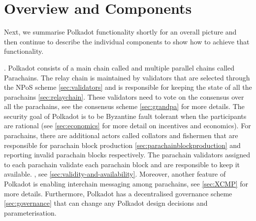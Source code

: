 \section{Overview and Components}\label{sec:components}
Next, we summarise Polkadot functionality shortly for an overall picture and then continue to describe the individual components to show how to achieve that functionality.

. Polkadot consists of a main chain called  and multiple parallel chains
called Parachains. The relay chain is maintained by validators that are selected through the NPoS scheme \ref{sec:validators} and is responsible for  keeping the state of all the parachains \ref{sec:relaychain}.
These validators need to vote on the consensus over all the parachains, see the consensus scheme \ref{sec:grandpa} for more details.
The security goal of Polkadot is to be Byzantine fault tolerant when the participants are rational (see \ref{sec:economics} for more detail on incentives and economics).
For parachains, there are additional actors called collators and fishermen that are responsible for parachain block production \ref{sec:parachainblockproduction} and reporting invalid parachain blocks respectively.
The parachain validators assigned to each parachain validate each parachain block and are responsible to keep it available. , see \ref{sec:validity-and-availability}. Moreover, another feature of Polkadot is enabling interchain messaging among parachains, see \ref{sec:XCMP} for more details.
Furthermore, Polkadot has a decentralised governance scheme \ref{sec:governance} that can change any Polkadot design decisions and parameterisation.










